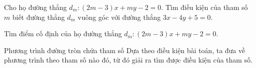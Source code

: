 \begin{bt}%
	Cho họ đường thẳng $d_m: (2m-3)x+my-2=0$. Tìm điều kiện của tham số $m$ biết đường thẳng $d_m$ vuông góc với đường thẳng $3x-4y+5=0$.
\end{bt}

\begin{bt}
	Tìm điểm cố định của họ đường thẳng $d_m: (2m-3)x+my-2=0$.
\end{bt}

\begin{dang}{Phương trình đường tròn chứa tham số}
	Dựa theo điều kiện bài toán, ta đưa về phương trình theo tham số nào đó, từ đó giải ra tìm được điều kiện của tham số.
\end{dang}

